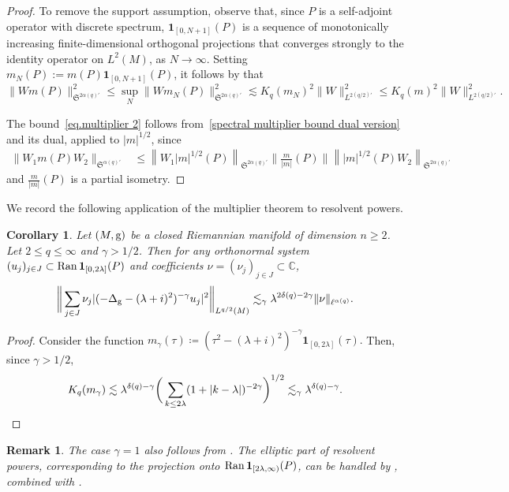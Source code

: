 \documentclass[12pt,reqno,a4paper]{amsart}
\newcommand{\Ran}{\mathop{\rm Ran}}
\newcommand{\C}{{\mathbb C}}
\newcommand{\g}{{\rm g}}
\newtheorem{corollary}[theorem]{Corollary}
\newtheorem{remark}[theorem]{Remark}
\begin{document}
\begin{proof}
To remove the support assumption, observe that, since $P$ is a self-adjoint operator with discrete spectrum, $\mathbf{1}_{[0,N+1]}(P)$ is a sequence of monotonically increasing finite-dimensional orthogonal projections that converges strongly to the identity operator on $L^2(M)$, as $N\to\infty.$ Setting $m_N(P):=m(P)\mathbf{1}_{[0,N+1]}(P)$, it follows by \cite[Theorem 5.2]{MR246142} that
\[
\|Wm(P)\|^2_{\mathfrak{S}^{2\alpha(q)'}}\leq \sup_N\|Wm_N(P)\|^2_{\mathfrak{S}^{2\alpha(q)'}}
\lesssim K_q(m_N)^2\|W\|^2_{L^{2(q/2)'}}\leq K_q(m)^2\|W\|^2_{L^{2(q/2)'}}.
\]
  
The bound~\eqref{eq.multiplier 2} follows from~\eqref{spectral multiplier bound dual version} and its dual, applied to $|m|^{1/2}$, since
  \begin{align*}
\|W_1m(P)W_2\|_{\mathfrak{S}^{\alpha(q)'}}
    &\leq 
    \left\lVert W_1|m|^{1/2}(P)\right\rVert_{\mathfrak{S}^{2\alpha(q)'}}
    \bigg \lVert\frac{m}{|m|}(P)\bigg \rVert
    \left\lVert |m|^{1/2}(P)W_2\right\lVert_{\mathfrak{S}^{2\alpha(q)'}}
  \end{align*}
  and $\frac{m}{|m|}(P)$ is a partial isometry.
\end{proof}

We record the following application of the multiplier theorem to resolvent powers.

\begin{corollary}
Let $(M,\g)$ be a closed Riemannian manifold of dimension $n\geq 2$. Let $2\leq q\leq\infty$ and $\gamma>1/2$. Then for any orthonormal system $(u_j)_{j\in J}\subset \Ran\mathbf{1}_{[0,2\lambda]}(P)$ and coefficients $\nu=(\nu_j)_{j\in J}\subset\C$,
  \begin{align*}
    \bigg\|\sum_{j\in J}\nu_j |(-\Delta_{\g}-(\lambda+i)^2)^{-\gamma}u_j|^2\bigg\|_{L^{q/2}(M)}\lesssim_{\gamma} \lambda^{2\delta(q)-2\gamma}\|\nu\|_{\ell^{\alpha(q)}}.
  \end{align*}
\end{corollary}

\begin{proof}
Consider the function 
$m_{\gamma}(\tau)\coloneqq (\tau^2-(\lambda+i)^2)^{-\gamma}\mathbf{1}_{[0,2\lambda]}(\tau).$
Then, since $\gamma>1/2$,
\[
K_q(m_{\gamma})\lesssim \lambda^{\delta(q)-\gamma}
\bigg(\sum_{k\leq 2\lambda}(1+|k-\lambda|)^{-2\gamma}\bigg)^{1/2}
\lesssim_{\gamma} \lambda^{\delta(q)-\gamma}.\qedhere
\]
\end{proof}

\begin{remark}
 The case $\gamma=1$ also follows from \cite[Proposition 3.1]{CueninNguyenSu2025}. The elliptic part of resolvent powers, corresponding to the projection onto $\Ran\mathbf{1}_{[2\lambda,\infty)}(P)$, can be handled by \cite[Proposition 24]{FrankSabin-2017clust}, combined with \cite[Lemma 2.4]{CueninNguyenSu2025}.    
\end{remark}
\end{document}
